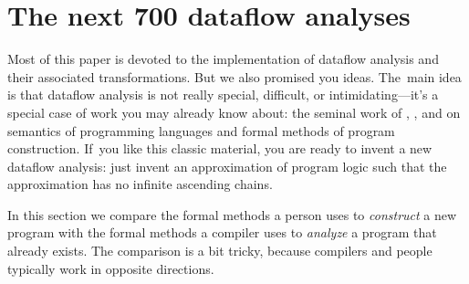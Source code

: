 \documentclass[blockstyle,preprint,nocopyrightspace]{sigplanconf}
\newcommand{\authornote}[1]{{\em #1}}
\def\authornote#1{\unskip\relax}
\newcommand{\simon}[1]{\authornote{SLPJ: #1}}
\newcommand{\norman}[1]{\authornote{NR: #1}}
\let\remark\norman
\newcommand\seclabel[1]{\label{sec:#1}}
\begin{document}
\section{The next 700 dataflow analyses}

\seclabel{next-700}


Most of this paper is devoted to the implementation of dataflow
analysis and their associated transformations.
But we also promised you ideas.
The~main idea is that dataflow analysis is not really special,
difficult, or intimidating---it's a special case of work you may
already know about:
the seminal work of
\citet{floyd:assigning-meanings},
\citet{hoare:axiomatic-basis},
and
\citet{dijkstra:discipline}
on semantics of programming languages and
 formal methods of program construction.
If~you like this classic material, you are ready to invent a new
dataflow analysis: just invent an approximation of program logic 
such that the approximation has no infinite ascending chains.

In this section we compare the formal methods a
person uses to 
\emph{construct} a new program with the formal methods a compiler uses
to \emph{analyze} a program that already exists.
The comparison is a bit tricky,
because compilers and
people typically work in opposite directions.
\end{document}
